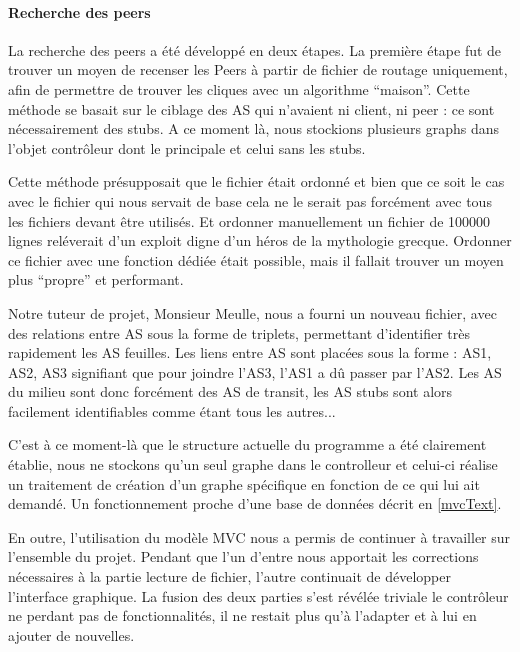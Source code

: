 \paragraph{Recherche des peers\\}
\par La recherche des peers a été développé en deux étapes. La première étape fut de trouver un moyen de recenser les Peers à partir de fichier de routage uniquement, afin de permettre de trouver les cliques avec un algorithme ``maison''. Cette méthode se basait sur le ciblage des AS qui n'avaient ni client, ni peer : ce sont n\'ecessairement des stubs. A ce moment là, nous stockions plusieurs graphs dans l'objet contrôleur dont le principale et celui sans les stubs.

Cette méthode présupposait que le fichier était ordonné et bien que ce soit le cas avec le fichier qui nous servait de base cela ne le serait pas forcément avec tous les fichiers devant être utilisés. Et ordonner manuellement un fichier de 100000 lignes reléverait d'un exploit digne d'un héros de la mythologie grecque. Ordonner ce fichier avec une fonction dédiée était possible, mais il fallait trouver un moyen plus ``propre'' et performant.

\par Notre tuteur de projet, Monsieur Meulle, nous a fourni un nouveau fichier, avec des relations entre AS sous la forme de triplets, permettant d'identifier tr\`es rapidement les AS feuilles.
Les liens entre AS sont plac\'ees sous la forme : {AS1, AS2, AS3} signifiant que pour joindre l'AS3, l'AS1 a dû passer par l'AS2. Les AS du milieu sont donc forcément des AS de transit, les AS stubs sont alors facilement identifiables comme \'etant tous les autres... 

C'est à ce moment-là que le structure actuelle du programme a été clairement établie, nous ne stockons qu'un seul graphe dans le controlleur et celui-ci réalise un traitement de création d'un graphe spécifique en fonction de ce qui lui ait demandé. Un fonctionnement proche d'une base de données décrit en \ref{mvcText}. 

En outre, l'utilisation du modèle MVC nous a permis de continuer à travailler sur l'ensemble du projet. Pendant que l'un d'entre nous apportait les corrections nécessaires à la partie lecture de fichier, l'autre continuait de développer l'interface graphique. La fusion des deux parties s'est révélée triviale le contrôleur ne perdant pas de fonctionnalités, il ne restait plus qu'à l'adapter et à lui en ajouter de nouvelles.
